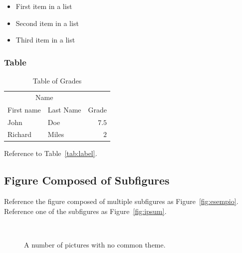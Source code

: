\documentclass[
10pt, %
a4paper, %
oneside, %
headinclude,footinclude, %
BCOR5mm, %
]{scrartcl}
\begin{document}

\begin{itemize}[noitemsep] %
\item First item in a list
\item Second item in a list
\item Third item in a list
\end{itemize}

\subsubsection{Table}


\begin{table}[hbt]
\caption{Table of Grades}
\centering
\begin{tabular}{llr}
\toprule
\multicolumn{2}{c}{Name} \\
\cmidrule(r){1-2}
First name & Last Name & Grade \\
\midrule
John & Doe & $7.5$ \\
Richard & Miles & $2$ \\
\bottomrule
\end{tabular}
\label{tab:label}
\end{table}

Reference to Table~\vref{tab:label}. %


\subsection{Figure Composed of Subfigures}

Reference the figure composed of multiple subfigures as Figure~\vref{fig:esempio}. Reference one of the subfigures as Figure~\vref{fig:ipsum}. %


\begin{figure}[tb]
\centering
{} \quad
{} \\
 \quad
{}
\caption[A number of pictures.]{A number of pictures with no common theme.} %
\label{fig:esempio}
\end{figure}
\end{document}
